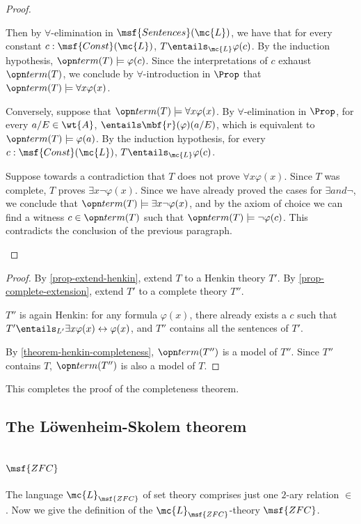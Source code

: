 \documentclass[11pt]{article}
\begin{document}
\begin{proof}
\begin{itemize}
  Then by $\forall$-elimination in $\msf{Sentences}(\mc{L})$, we have that for every constant $c : \msf{Const}(\mc{L})$, $T \entails_{\mc{L}} \varphi(c)$. By the induction hypothesis, $\term(T) \models \varphi(c)$. Since the interpretations of $c$ exhaust $\term(T)$, we conclude by $\forall$-introduction in $\Prop$ that $\term(T) \models \forall x \varphi(x)$.

  Conversely, suppose that $\term(T) \models \forall x \varphi(x)$. By $\forall$-elimination in $\Prop$, for every $a/E \in \wt{A}$, $\entails \mbf{r}(\varphi)(a/E)$, which is equivalent to $\term(T) \models \varphi(a)$. By the induction hypothesis, for every $c : \msf{Const}(\mc{L})$, $T \entails_{\mc{L}} \varphi(c)$.

  Suppose towards a contradiction that $T$ does not prove $\forall x \varphi(x)$. Since $T$ was complete, $T$ proves $\exists x \neg \varphi(x)$. Since we have already proved the cases for $\exists and \neg$, we conclude that $\term(T) \models \exists x \neg \varphi(x)$, and by the axiom of choice we can find a witness $c \in \term(T)$ such that $\term(T) \models \neg \varphi(c)$. This contradicts the conclusion of the previous paragraph.
\end{itemize}
\end{proof}


\begin{proof}
  By \ref{prop-extend-henkin}, extend $T$ to a Henkin theory $T'$. By \ref{prop-complete-extension}, extend $T'$ to a complete theory $T''$.

  $T''$ is again Henkin: for any formula $\varphi(x)$, there already exists a $c$ such that $T' \entails_{L'} \exists x \varphi(x) \leftrightarrow \varphi(x)$, and $T''$ contains all the sentences of $T'$.

  By \ref{theorem-henkin-completeness}, $\term(T'')$ is a model of $T''$. Since $T''$ contains $T$, $\term(T'')$ is also a model of $T$.
\end{proof}

This completes the proof of the completeness theorem.

\subsection{The L\"owenheim-Skolem theorem}
\newpage \section{$\msf{ZFC}$}
The language $\mc{L}_{\msf{ZFC}}$ of set theory comprises just one $2$-ary relation $\in$. Now we give the definition of the $\mc{L}_{\msf{ZFC}}$-theory $\msf{ZFC}$.
\end{document}
